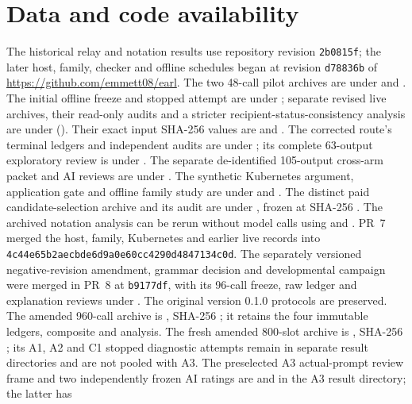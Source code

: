 \documentclass[preprint,12pt]{elsarticle}
\begin{document}
\section*{Data and code availability}
The historical relay and notation results use repository revision \texttt{2b0815f}; the later host, family, checker and offline schedules began at revision \texttt{d78836b} of \url{https://github.com/emmett08/earl}. The two 48-call pilot archives are under  and . The initial offline freeze and stopped attempt are under ; separate revised live archives, their read-only audits and a stricter recipient-status-consistency analysis are under  (). Their exact input SHA-256 values are  and . The corrected route's terminal ledgers and independent audits are under ; its complete 63-output exploratory review is under . The separate de-identified 105-output cross-arm packet and AI reviews are under . The synthetic Kubernetes argument, application gate and offline family study are under  and . The distinct paid candidate-selection archive and its audit are under , frozen at SHA-256 . The archived notation analysis can be rerun without model calls using  and . PR~7 merged the host, family, Kubernetes and earlier live records into \texttt{4c44e65b2aecbde6d9a0e60cc4290d4847134c0d}. The separately versioned negative-revision amendment, grammar decision and developmental campaign were merged in PR~8 at \texttt{b9177df}, with its 96-call freeze, raw ledger and explanation reviews under . The original version 0.1.0 protocols are preserved. The amended 960-call archive is , SHA-256 ; it retains the four immutable ledgers, composite and analysis. The fresh amended 800-slot archive is , SHA-256 ; its A1, A2 and C1 stopped diagnostic attempts remain in separate result directories and are not pooled with A3. The preselected A3 actual-prompt review frame and two independently frozen AI ratings are  and  in the A3 result directory; the latter has 
\end{document}
